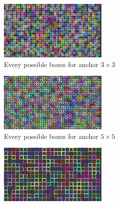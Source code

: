 \begin{figure}
  \begin{center}
    \begin{subfigure}[t]{.49\linewidth}
      \centering
      \includegraphics[width=0.99\linewidth]{figures/anchors/boxes_layers_0.png}
      \caption{Every possible boxes for anchor $3\times3$}
    \end{subfigure}
    \begin{subfigure}[t]{.49\linewidth}
      \centering
      \includegraphics[width=0.99\linewidth]{figures/anchors/boxes_layers_1.png}
      \caption{Every possible boxes for anchor $5\times5$}
    \end{subfigure}
    \begin{subfigure}[t]{.49\linewidth}
      \centering
      \includegraphics[width=0.99\linewidth]{figures/anchors/boxes_layers_2.png}

\end{subfigure}
\end{center}
\end{figure}
